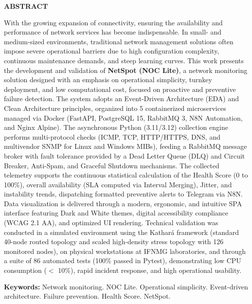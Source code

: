 \documentclass[12pt,a4paper]{article}
\newcommand{\pretextualtitle}[1]{\begin{center}\textbf{\MakeUppercase{#1}}\end{center}\vspace{1em}}
\begin{document}
\pretextualtitle{ABSTRACT}
With the growing expansion of connectivity, ensuring the availability and performance of network services has become indispensable. In small- and medium-sized environments, traditional network management solutions often impose severe operational barriers due to high configuration complexity, continuous maintenance demands, and steep learning curves. This work presents the development and validation of \textbf{NetSpot (NOC Lite)}, a network monitoring solution designed with an emphasis on operational simplicity, turnkey deployment, and low computational cost, focused on proactive and preventive failure detection. The system adopts an Event-Driven Architecture (EDA) and Clean Architecture principles, organized into 5 containerized microservices managed via Docker (FastAPI, PostgreSQL 15, RabbitMQ 3, N8N Automation, and Nginx Alpine). The asynchronous Python (3.11/3.12) collection engine performs multi-protocol checks (ICMP, TCP, HTTP/HTTPS, DNS, and multivendor SNMP for Linux and Windows MIBs), feeding a RabbitMQ message broker with fault tolerance provided by a Dead Letter Queue (DLQ) and Circuit Breaker, Anti-Spam, and Graceful Shutdown mechanisms. The collected telemetry supports the continuous statistical calculation of the Health Score (0 to 100\%), overall availability (SLA computed via Interval Merging), Jitter, and instability trends, dispatching formatted preventive alerts to Telegram via N8N. Data visualization is delivered through a modern, ergonomic, and intuitive SPA interface featuring Dark and White themes, digital accessibility compliance (WCAG 2.1 AA), and optimized UI rendering. Technical validation was conducted in a simulated environment using the Kathará framework (standard 40-node routed topology and scaled high-density stress topology with 126 monitored nodes), on physical workstations at IFNMG laboratories, and through a suite of 86 automated tests (100\% passed in Pytest), demonstrating low CPU consumption ($<$ 10\%), rapid incident response, and high operational usability.

\vspace{1em}
\noindent\textbf{Keywords:} Network monitoring. NOC Lite. Operational simplicity. Event-driven architecture. Failure prevention. Health Score. NetSpot.
\clearpage

\listoffigures
\clearpage
\listoftables
\clearpage
\end{document}
